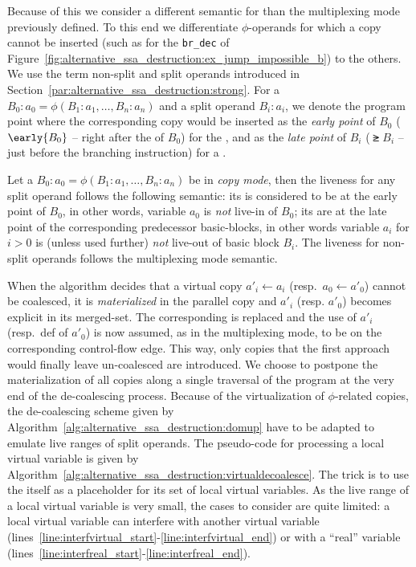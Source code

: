 Because of this we consider a different semantic for \phifuns than the multiplexing mode previously defined. 
To this end we differentiate $\phi$-operands for which a copy cannot be inserted (such as for the \texttt{br\_dec} of Figure~\ref{fig:alternative_ssa_destruction:ex_jump_impossible_b}) to the others. 
We use the term non-split and split operands introduced in Section~\ref{par:alternative_ssa_destruction:strong}. 
For a \phifun $B_0:a_0=\phi(B_1:a_1,\dots,B_n:a_n)$ and a split operand $B_i:a_i$, we denote the program point where the corresponding copy would be inserted as the \emph{early point} of $B_0$ ($\early{B_0}$ -- right after the \phifuns of $B_0$) for the , and as the \emph{late point} of $B_i$ ($\late{B_i}$ -- just before the branching instruction) for a \useop.
\begin{definition}
Let a \phifun $B_0:a_0=\phi(B_1:a_1,\dots,B_n:a_n)$ be in \emph{copy mode}, then the liveness for any split operand follows the following semantic: its  is considered to be at the early point of $B_0$, in other words, variable $a_0$ is \emph{not} live-in of $B_0$; its \useops are at the late point of the corresponding predecessor basic-blocks, in other words variable $a_i$ for $i>0$ is (unless used further) \emph{not} live-out of basic block $B_i$. The liveness for non-split operands follows the multiplexing mode semantic. 
\end{definition}

When the algorithm decides that a virtual copy $a'_i \gets a_i$ (resp.~$a_0 \gets a'_0$) cannot be coalesced, it is \emph{materialized} in the parallel copy and $a'_i$ (resp. 
$a'_0$) becomes explicit in its merged-set. 
The corresponding \phiop is replaced and the use of $a'_i$ (resp.~def of $a'_0$) is now assumed, as in the multiplexing mode, to be on the corresponding control-flow edge. 
This way, only copies that the first approach would finally leave un-coalesced are introduced. 
We choose to postpone the materialization of all copies along a single traversal of the program at the very end of the de-coalescing process. 
Because of the virtualization of $\phi$-related copies, the de-coalescing scheme given by Algorithm~\ref{alg:alternative_ssa_destruction:domup} have to be adapted to emulate live ranges of split operands. 
The pseudo-code for processing a local virtual variable is given by Algorithm~\ref{alg:alternative_ssa_destruction:virtualdecoalesce}. 
The trick is to use the \phifun itself as a placeholder for its set of local virtual variables. 
As the live range of a local virtual variable is very small, the cases to consider are quite limited: 
a local virtual variable can interfere with another virtual variable (lines~\ref{line:interfvirtual_start}-\ref{line:interfvirtual_end}) or with a ``real'' variable (lines~\ref{line:interfreal_start}-\ref{line:interfreal_end}).

